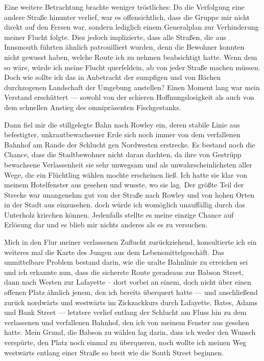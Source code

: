 Eine weitere Betrachtung brachte weniger tröstliches: Da die Verfolgung eine andere Straße hinunter verlief, war es offensichtlich, dass die Gruppe mir nicht direkt auf den Fersen war, sondern lediglich einem Generalplan zur Verhinderung meiner Flucht folgte. Dies jedoch implizierte, dass alle Straßen, die aus Innsmouth führten ähnlich patrouilliert wurden, denn die Bewohner konnten nicht gewusst haben, welche Route ich zu nehmen beabsichtigt hatte. Wenn dem so wäre, würde ich meine Flucht querfeldein, ab von jeder Straße machen müssen. Doch wie sollte ich das in Anbetracht der sumpfigen und von Bächen durchzogenen Landschaft der Umgebung anstellen? Einen Moment lang war mein Verstand erschüttert --- sowohl von der schieren Hoffnungslosigkeit als auch von dem schnellen Anstieg des omnipräsenten Fischgestanks.

Dann fiel mir die stillgelegte Bahn nach Rowley ein, deren stabile Linie aus befestigter, unkrautbewachsener Erde sich noch immer von dem verfallenen Bahnhof am Rande der Schlucht gen Nordwesten erstrecke. Es bestand noch die Chance, dass die Stadtbewohner nicht daran dachten, da ihre von Gestrüpp bewachsene Verlassenheit sie sehr unwegsam und als unwahrscheinlichsten aller Wege, die ein Flüchtling wählen mochte erscheinen ließ. Ich hatte sie klar von meinem Hotelfenster aus gesehen und wusste, wo sie lag. Der größte Teil der Strecke war unangenehm gut von der Straße nach Rowley und von hohen Orten in der Stadt aus einzusehen. doch würde ich womöglich unauffällig durch das Unterholz kriechen können. Jedenfalls stellte es meine einzige Chance auf Erlösung dar und es blieb mir nichts anderes als es zu versuchen.

Mich in den Flur meiner verlassenen Zuflucht zurückziehend, konsultierte ich ein weiteres mal die Karte des Jungen aus dem Lebensmittelgeschäft. Das unmittelbare Problem bestand darin, wie die uralte Bahnlinie zu erreichen sei und ich erkannte nun, dass die sicherste Route geradeaus zur Babson Street, dann nach Westen zur Lafayette -- dort vorbei an einem, doch nicht über einen offenen Platz ähnlich jenem, den ich bereits überquert hatte --- und anschließend zurück nordwärts und westwärts im Zickzackkurs durch Lafayette, Bates, Adams und Bank Street --- letztere verlief entlang der Schlucht am Fluss hin zu dem verlassenen und verfallenen Bahnhof, den ich von meinem Fenster aus gesehen hatte. Mein Grund, die Babson zu wählen lag darin, dass ich weder den Wunsch verspürte, den Platz noch einmal zu überqueren, noch wollte ich meinen Weg westwärts entlang einer Straße so breit wie die South Street beginnen.

